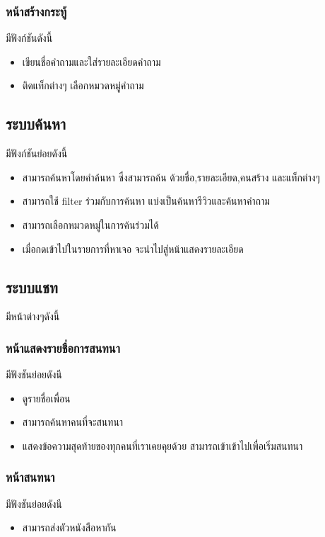 \subsubsection{หน้าสร้างกระทู้ }
มีฟังก์ชันดังนี้
\begin{itemize}
  \item เขียนชื่อคำถามและใส่รายละเอียดคำถาม
  \item ติดแท็กต่างๆ เลือกหมวดหมู่คำถาม
 \end{itemize}


 \subsection{ระบบค้นหา }
มีฟังก์ชันย่อยดังนี้
\begin{itemize}
  \item สามารถค้นหาโดยคำค้นหา ซึ่งสามารถค้น ด้วยชื่อ,รายละเอียด,คนสร้าง และแท็กต่างๆ
  \item สามารถใช้ filter ร่วมกับการค้นหา แบ่งเป็นค้นหารีวิวและค้นหาคำถาม 
  \item สามารถเลือกหมวดหมู่ในการค้นร่วมได้
  \item เมื่อกดเข้าไปในรายการที่หาเจอ จะนำไปสู่หน้าแสดงรายละเอียด
 \end{itemize}


 \subsection{ระบบแชท }
 มีหน้าต่างๆดังนี้
 
 \subsubsection{หน้าแสดงรายชื่อการสนทนา }
 มีฟังชันย่อยดังนี
\begin{itemize}
  \item ดูรายชื่อเพื่อน
  \item สามารถค้นหาคนที่จะสนทนา
  \item แสดงข้อความสุดท้ายของทุกคนที่เราเคยคุยด้วย สามารถเข้าเข้าไปเพื่อเริ่มสนทนา
 \end{itemize}
 
 \subsubsection{หน้าสนทนา }
 มีฟังชันย่อยดังนี
\begin{itemize}
  \item สามารถส่งตัวหนังสือหากัน
 \end{itemize}

